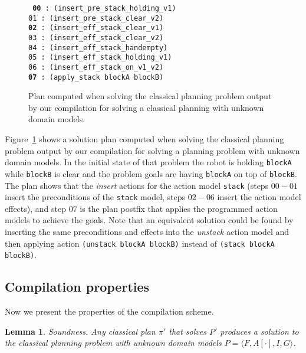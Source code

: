 \documentclass{article}
\newcommand{\tup}[1]{{\langle #1 \rangle}}
\newtheorem{mylemma}[mytheorem]{Lemma}
\begin{document}
\begin{figure}[hbt!]
	{\scriptsize\tt
		{\bf 00} : (insert\_pre\_stack\_holding\_v1) \\
		01 : (insert\_pre\_stack\_clear\_v2)\\
		{\bf 02} : (insert\_eff\_stack\_clear\_v1)\\
		03 : (insert\_eff\_stack\_clear\_v2)\\
		04 : (insert\_eff\_stack\_handempty)\\
		05 : (insert\_eff\_stack\_holding\_v1)\\
		06 : (insert\_eff\_stack\_on\_v1\_v2)\\
		{\bf 07} : (apply\_stack blockA blockB)\\
	}
	\caption{\small Plan computed when solving the classical planning problem output by our compilation for solving a classical planning with unknown domain models.}
	\label{fig:plan-lplan}
\end{figure}

Figure~\ref{fig:plan-lplan} shows a solution plan computed when solving the classical planning problem output by our compilation for solving a planning problem with unknown domain models. In the initial state of that problem the robot is holding {\tt blockA} while {\tt blockB} is clear and the problem goals are having {\tt blockA} on top of {\tt blockB}. The plan shows that the {\em insert} actions for the action model {\tt\small stack} (steps $00-01$ insert the preconditions of the {\tt\small stack} model, steps $02-06$ insert the action model effects), and step $07$ is the plan postfix that applies the programmed action models to achieve the goals. Note that an equivalent solution could be found by inserting the same preconditions and effects into the {\em unstack} action model and then applying action {\tt\small (unstack blockA blockB)} instead of {\tt\small(stack blockA blockB)}.


\subsection{Compilation properties}
Now we present the properties of the compilation scheme.

\begin{mylemma}
Soundness. Any classical plan $\pi'$ that solves $P'$ produces a solution to the classical planning problem with unknown domain models $P=\tup{F,A[\cdot],I,G}$.
\end{mylemma}
\end{document}
